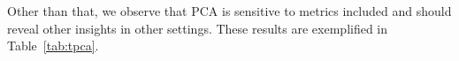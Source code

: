 																																																																																																																																																																																																																																																																																																																																																																																																				Other than that, we observe that PCA is sensitive to metrics included
																																																																																																																																																																																																																																																																																																																																																																																																				and should reveal other insights in other settings.
																																																																																																																																																																																																																																																																																																																																																																																																				These results are exemplified in Table~\ref{tab:tpca}.

